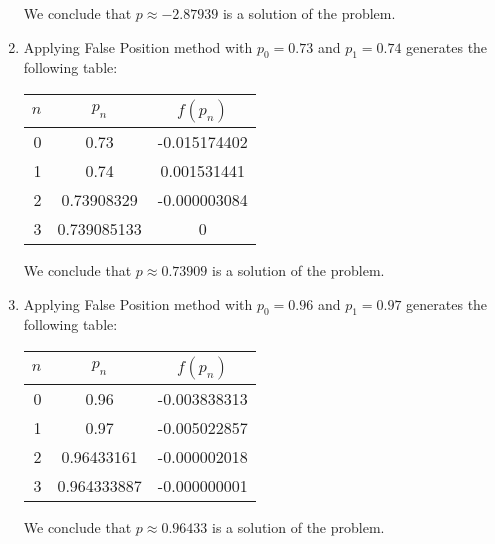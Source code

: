 \documentclass[../../../../Assignments]{subfiles}
\begin{document}
\begin{solution}
\begin{enumerate}[label= \alph*)]
            We conclude that \(p \approx \num{-2.87939}\) is a solution of the
            problem.

        \item Applying False Position method with \(p_0 = \num{0.73}\) and \(p_1
            = \num{0.74}\) generates the following table:

            \begin{table}[H]
                \centering
                \begin{tabular}{r S[table-format=1.9] S[table-format=-1.9]}
                    \toprule
                    \(n\)  &    {\(p_n\)}   &  {\(f(p_n)\)}  \\
                      &   0.73         &  -0.015174402  \\
                        1  &   0.74         &   0.001531441  \\
                        2  &   0.73908329   &  -0.000003084  \\
                        3  &   0.739085133  &   0            \\
                    \bottomrule
                \end{tabular}
            \end{table}

            We conclude that \(p \approx \num{0.73909}\) is a solution of the
            problem.

        \item Applying False Position method with \(p_0 = \num{0.96}\) and \(p_1
            = \num{0.97}\) generates the following table:

            \begin{table}[H]
                \centering
                \begin{tabular}{r S[table-format=1.9] S[table-format=-1.9]}
                    \toprule
                    \(n\)  &   {\(p_n\)}   &  {\(f(p_n)\)}  \\
                      &  0.96         &  -0.003838313  \\
                        1  &  0.97         &  -0.005022857  \\
                        2  &  0.96433161   &  -0.000002018  \\
                        3  &  0.964333887  &  -0.000000001  \\
                    \bottomrule
                \end{tabular}
            \end{table}

            We conclude that \(p \approx \num{0.96433}\) is a solution of the
            problem.
    \end{enumerate}
\end{solution}
\end{document}
